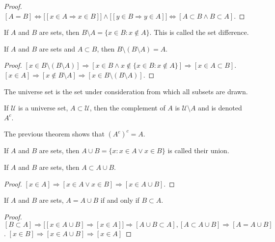 \documentclass[crop=false,class=article,oneside]{standalone}
\begin{document}
        \begin{proof}
        $[A=B]\Leftrightarrow\big[[x\in A \Rightarrow x\in B]\big]\land \big[[y\in B \Rightarrow y\in A]\big]\Leftrightarrow [A\subset B\land B\subset A]$. 
        \end{proof}
        \begin{definition}
        If $A$ and $B$ are sets, then $B\setminus A = \{x\in B:x\notin A\}$. This is called the set difference.
        \end{definition}
        \begin{theorem}
        If $A$ and $B$ are sets and $A\subset B$, then $B\setminus(B\setminus A)=A$.
        \end{theorem}
        \begin{proof}
        $[x\in B\setminus(B\setminus A)]\Rightarrow [x\in B \land x\notin \{x\in B:x\notin A\}]\Rightarrow [x\in A\subset B]$. $[x\in A]\Rightarrow [x\notin B\setminus A]\Rightarrow [x\in B\setminus(B\setminus A)]$.
        \end{proof}
        \begin{definition}
        The universe set is the set under consideration from which all subsets are drawn.
        \end{definition}
        \begin{definition}
        If $\mathcal{U}$ is a universe set, $A\subset \mathcal{U}$, then the complement of $A$ is $\mathcal{U}\setminus A$ and is denoted $A^c$.
        \end{definition}
        \begin{remark}
        The previous theorem shows that $(A^c)^c = A$.
        \end{remark}
        \begin{definition}
        If $A$ and $B$ are sets, then $A\cup B = \{x: x\in A \lor x\in B\}$ is called their union.
        \end{definition}
        \begin{corollary}
        If $A$ and $B$ are sets, then $A\subset A\cup B$.
        \end{corollary}
        \begin{proof}
        $[x\in A]\Rightarrow [x\in A\lor x\in B]\Rightarrow [x\in A\cup B]$.
        \end{proof}
        \begin{theorem}
        If $A$ and $B$ are sets, $A=A\cup B$ if and only if $B\subset A$.
        \end{theorem}
        \begin{proof}
        $[B\subset A]\Rightarrow \big[[x\in A\cup B] \Rightarrow [x\in A]\big]\Rightarrow[A\cup B \subset A], [A\subset A\cup B]\Rightarrow[A=A\cup B]$. $[x\in B] \Rightarrow [x\in A\cup B]\Rightarrow [x\in A]$
        \end{proof}
\end{document}

